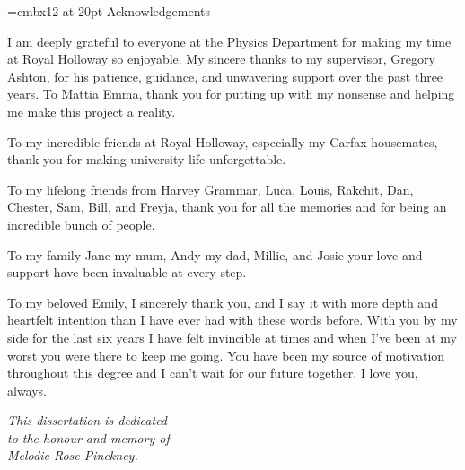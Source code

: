 \font\myfont=cmbx12 at 20pt
\Large
{\myfont Acknowledgements}

I am deeply grateful to everyone at the Physics Department for making my time at Royal Holloway so enjoyable. My sincere thanks to my supervisor, Gregory Ashton, for his patience, guidance, and unwavering support over the past three years. To Mattia Emma, thank you for putting up with my nonsense and helping me make this project a reality.

To my incredible friends at Royal Holloway, especially my Carfax housemates, thank you for making university life unforgettable.

To my lifelong friends from Harvey Grammar, Luca, Louis, Rakchit, Dan, Chester, Sam, Bill, and Freyja, thank you for all the memories and for being an incredible bunch of people.

To my family Jane my mum, Andy my dad, Millie, and Josie your love and support have been invaluable at every step.

To my beloved Emily, I sincerely thank you, and I say it with more depth and heartfelt intention than I have ever had with these words before. With you by my side for the last six years I have felt invincible at times and when I've been at my worst you were there to keep me going. You have been my source of motivation throughout this degree and I can't wait for our future together. I love you, always.

\newpage


\begin{center}
    \emph{This dissertation is dedicated \\ to the honour and memory of \\ Melodie Rose Pinckney.}
\end{center}

\restoregeometry